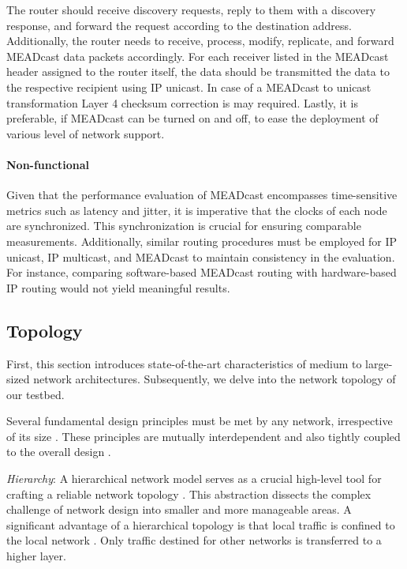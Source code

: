The router should receive discovery requests, reply to them with a discovery
    response, and forward the request according to the destination address.
Additionally, the router needs to receive, process, modify, replicate, and
    forward MEADcast data packets accordingly.
For each receiver listed in the MEADcast header assigned to the router itself,
    the data should be transmitted the data to the respective recipient using
    IP unicast.
In case of a MEADcast to unicast transformation Layer 4 checksum correction is
    may required.
Lastly, it is preferable, if MEADcast can be turned on and off, to ease the
    deployment of various level of network support.

\paragraph{Non-functional} %
\label{par:Non-functional}
Given that the performance evaluation of MEADcast encompasses time-sensitive
    metrics such as latency and jitter, it is imperative that the clocks of
    each node are synchronized.
This synchronization is crucial for ensuring comparable measurements.
Additionally, similar routing procedures must be employed for IP unicast, IP
    multicast, and MEADcast to maintain consistency in the evaluation.
For instance, comparing software-based MEADcast routing with hardware-based IP
    routing would not yield meaningful results.

\subsection{Topology} %
\label{sub:03_Topology}
First, this section introduces state-of-the-art characteristics of medium to
    large-sized network architectures.
Subsequently, we delve into the network topology of our testbed.

Several fundamental design principles must be met by any network, irrespective
    of its size \cite{cisco_net_size}.
These principles are mutually interdependent and also tightly coupled to the
    overall design \cite{cisco_campus_net}.

\textit{Hierarchy}: A hierarchical network model serves as a crucial high-level
    tool for crafting a reliable network topology \cite{cisco_net_size}.
This abstraction dissects the complex challenge of network design into smaller
    and more manageable areas.
A significant advantage of a hierarchical topology is that local traffic
    is confined to the local network \cite{cisco_campus_net}.
Only traffic destined for other networks is transferred to a higher layer.

